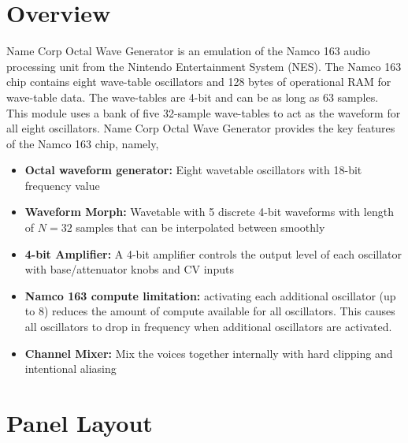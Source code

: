 \documentclass[12pt,letter]{article}
\begin{document}


\section{Overview}

Name Corp Octal Wave Generator is an emulation of the Namco 163 audio processing unit from the Nintendo Entertainment System (NES). The Namco 163 chip contains eight wave-table oscillators and 128 bytes of operational RAM for wave-table data. The wave-tables are 4-bit and can be as long as 63 samples. This module uses a bank of five 32-sample wave-tables to act as the waveform for all eight oscillators. Name Corp Octal Wave Generator provides the key features of the Namco 163 chip, namely,
\begin{itemize}
  \item \textbf{Octal waveform generator:} Eight wavetable oscillators with 18-bit frequency value
  \item \textbf{Waveform Morph:} Wavetable with 5 discrete 4-bit waveforms with length of $N = 32$ samples that can be interpolated between smoothly
  \item \textbf{4-bit Amplifier:} A 4-bit amplifier controls the output level of each oscillator with base/attenuator knobs and CV inputs
  \item \textbf{Namco 163 compute limitation:} activating each additional oscillator (up to 8) reduces the amount of compute available for all oscillators. This causes all oscillators to drop in frequency when additional oscillators are activated.
  \item \textbf{Channel Mixer:} Mix the voices together internally with hard clipping and intentional aliasing
\end{itemize}


\clearpage
\section{Panel Layout}
\end{document}
